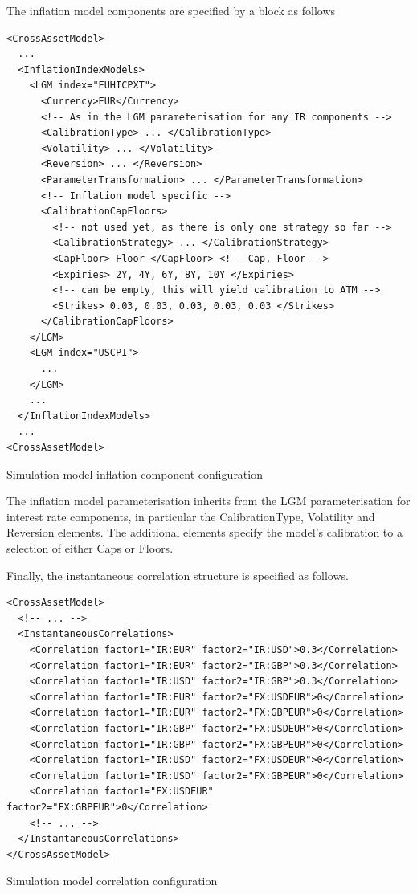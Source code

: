 \documentclass[12pt, a4paper]{article}
\begin{document}
\medskip
The inflation model components are specified by a block as follows

\begin{listing}[H]
\begin{verbatim}
<CrossAssetModel>	
  ...
  <InflationIndexModels>
    <LGM index="EUHICPXT">
      <Currency>EUR</Currency>
      <!-- As in the LGM parameterisation for any IR components -->
      <CalibrationType> ... </CalibrationType>
      <Volatility> ... </Volatility>
      <Reversion> ... </Reversion> 
      <ParameterTransformation> ... </ParameterTransformation>
      <!-- Inflation model specific -->
      <CalibrationCapFloors>
        <!-- not used yet, as there is only one strategy so far -->
        <CalibrationStrategy> ... </CalibrationStrategy> 
        <CapFloor> Floor </CapFloor> <!-- Cap, Floor -->
        <Expiries> 2Y, 4Y, 6Y, 8Y, 10Y </Expiries>
        <!-- can be empty, this will yield calibration to ATM -->
        <Strikes> 0.03, 0.03, 0.03, 0.03, 0.03 </Strikes> 
      </CalibrationCapFloors>
    </LGM>
    <LGM index="USCPI">
      ...
    </LGM>
    ...
  </InflationIndexModels>
  ...
<CrossAssetModel>	
\end{verbatim}
\caption{Simulation model inflation component configuration}
\label{lst:simulation_model_inflation_configuration}
\end{listing}

The inflation model parameterisation inherits from the LGM parameterisation for interest rate components, in particular the CalibrationType, Volatility and Reversion elements.  The additional elements specify the model's calibration to a selection of either Caps or Floors.

\medskip
Finally, the instantaneous correlation structure is specified as follows.

\begin{listing}[H]
\begin{verbatim}
<CrossAssetModel>	
  <!-- ... -->
  <InstantaneousCorrelations>
    <Correlation factor1="IR:EUR" factor2="IR:USD">0.3</Correlation>
    <Correlation factor1="IR:EUR" factor2="IR:GBP">0.3</Correlation>
    <Correlation factor1="IR:USD" factor2="IR:GBP">0.3</Correlation>
    <Correlation factor1="IR:EUR" factor2="FX:USDEUR">0</Correlation>
    <Correlation factor1="IR:EUR" factor2="FX:GBPEUR">0</Correlation>
    <Correlation factor1="IR:GBP" factor2="FX:USDEUR">0</Correlation>
    <Correlation factor1="IR:GBP" factor2="FX:GBPEUR">0</Correlation>
    <Correlation factor1="IR:USD" factor2="FX:USDEUR">0</Correlation>
    <Correlation factor1="IR:USD" factor2="FX:GBPEUR">0</Correlation>
    <Correlation factor1="FX:USDEUR" factor2="FX:GBPEUR">0</Correlation>
    <!-- ... --> 
  </InstantaneousCorrelations>
</CrossAssetModel>
\end{verbatim}
\caption{Simulation model correlation configuration}
\label{lst:simulation_model_correlation_configuration}
\end{listing}
\end{document}
